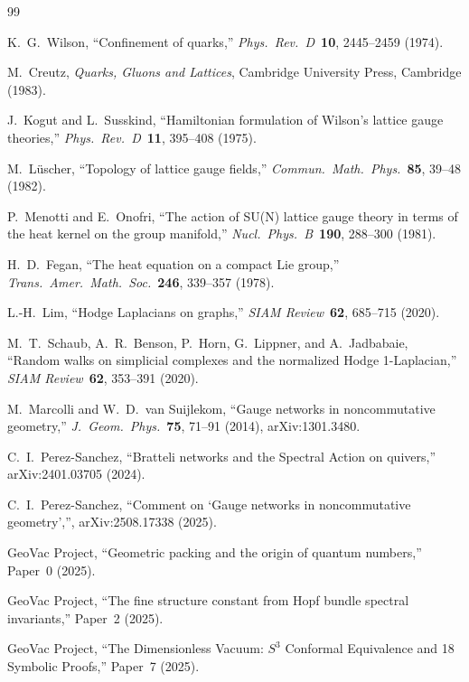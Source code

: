 \documentclass[11pt]{article}
\begin{document}
\begin{thebibliography}{99}

K.~G.~Wilson, ``Confinement of quarks,''
\textit{Phys.~Rev.~D}\ \textbf{10}, 2445--2459 (1974).

M.~Creutz, \textit{Quarks, Gluons and Lattices},
Cambridge University Press, Cambridge (1983).

J.~Kogut and L.~Susskind, ``Hamiltonian formulation of Wilson's
lattice gauge theories,''
\textit{Phys.~Rev.~D}\ \textbf{11}, 395--408 (1975).

M.~L\"uscher, ``Topology of lattice gauge fields,''
\textit{Commun.~Math.~Phys.}\ \textbf{85}, 39--48 (1982).

P.~Menotti and E.~Onofri, ``The action of SU(N) lattice gauge
theory in terms of the heat kernel on the group manifold,''
\textit{Nucl.~Phys.~B}\ \textbf{190}, 288--300 (1981).

H.~D.~Fegan, ``The heat equation on a compact Lie group,''
\textit{Trans.~Amer.~Math.~Soc.}\ \textbf{246}, 339--357 (1978).

L.-H.~Lim, ``Hodge Laplacians on graphs,''
\textit{SIAM Review}\ \textbf{62}, 685--715 (2020).

M.~T.~Schaub, A.~R.~Benson, P.~Horn, G.~Lippner, and A.~Jadbabaie,
``Random walks on simplicial complexes and the normalized Hodge 1-Laplacian,''
\textit{SIAM Review}\ \textbf{62}, 353--391 (2020).

M.~Marcolli and W.~D.~van Suijlekom,
``Gauge networks in noncommutative geometry,''
\textit{J.~Geom.~Phys.}\ \textbf{75}, 71--91 (2014),
arXiv:1301.3480.

C.~I.~Perez-Sanchez,
``Bratteli networks and the Spectral Action on quivers,''
arXiv:2401.03705 (2024).

C.~I.~Perez-Sanchez,
``Comment on `Gauge networks in noncommutative geometry','',
arXiv:2508.17338 (2025).

GeoVac Project, ``Geometric packing and the origin of quantum
numbers,'' Paper~0 (2025).

GeoVac Project, ``The fine structure constant from Hopf bundle
spectral invariants,'' Paper~2 (2025).

GeoVac Project, ``The Dimensionless Vacuum: $S^3$ Conformal
Equivalence and 18 Symbolic Proofs,'' Paper~7 (2025).


\end{thebibliography}
\end{document}

